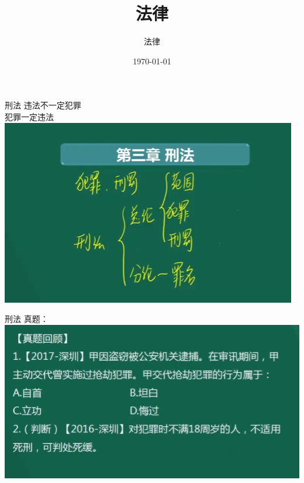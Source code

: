 \documentclass[aspectratio=169]{beamer}
\begin{document}
%
%

\title{法律}
\author{法律}
\date{\today}

\begin{frame}
\titlepage
\end{frame}


\begin{frame}[t]{刑法}
    违法不一定犯罪\\
    犯罪一定违法\\

    \includegraphics[scale=0.5]{criminal_law_intro}\\ 
\end{frame}


\begin{frame}[t]{刑法}
    真题：\\
    \includegraphics[scale=0.4]{criminal_law_001}\\ 
\end{frame}
\end{document}
